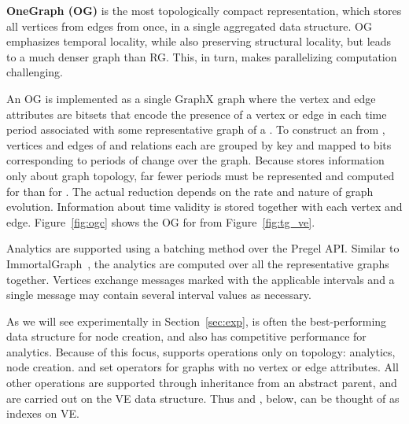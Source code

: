 {\bf OneGraph (OG)} is the most topologically compact representation,
which stores all vertices from  edges from \tae once, in
a single aggregated data structure.  OG emphasizes temporal locality,
while also preserving structural locality, but leads to a much denser
graph than RG.  This, in turn, makes parallelizing computation
challenging.

An OG is implemented as a single GraphX graph where the vertex and
edge attributes are bitsets that encode the presence of a vertex or
edge in each time period associated with some representative graph of
a \tg.  To construct an \og from \tve, vertices and edges of \tv and
\te relations each are grouped by key and mapped to bits corresponding
to periods of change over the graph.  Because \og stores information
only about graph topology, far fewer periods must be represented and
computed for \og than for \rg.  The actual reduction depends on the
rate and nature of graph evolution.  Information about time validity
is stored together with each vertex and edge.  Figure~\ref{fig:ogc}
shows the OG for  from Figure~\ref{fig:tg_ve}.

Analytics are supported using a batching method over the Pregel API.
Similar to ImmortalGraph~\cite{Miao2015}, the analytics are computed
over all the representative graphs together.  Vertices exchange
messages marked with the applicable intervals and a single message may
contain several interval values as necessary.

As we will see experimentally in Section~\ref{sec:exp}, \og is often
the best-performing data structure for node creation, and also has
competitive performance for analytics.  Because of this focus, \og
supports operations only on topology: analytics, node creation. and
set operators for graphs with no vertex or edge attributes.  All other
operations are supported through inheritance from an abstract parent,
and are carried out on the VE data structure.  Thus \og and \hg,
below, can be thought of as indexes on VE.

